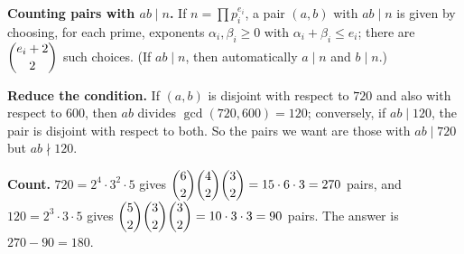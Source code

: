 \textbf{Counting pairs with $ab\mid n$.} If $n=\prod p_i^{e_i}$, a pair $(a,b)$ with $ab\mid n$ is given by choosing, for each prime, exponents $\alpha_i,\beta_i\ge0$ with $\alpha_i+\beta_i\le e_i$; there are $\dbinom{e_i+2}{2}$ such choices. (If $ab\mid n$, then automatically $a\mid n$ and $b\mid n$.)

\textbf{Reduce the condition.} If $(a,b)$ is disjoint with respect to $720$ and also with respect to $600$, then $ab$ divides $\gcd(720,600)=120$; conversely, if $ab\mid120$, the pair is disjoint with respect to both. So the pairs we want are those with $ab\mid720$ but $ab\nmid120$.

\textbf{Count.} $720=2^4\cdot3^2\cdot5$ gives $\dbinom62\dbinom42\dbinom32=15\cdot6\cdot3=270$ pairs, and $120=2^3\cdot3\cdot5$ gives $\dbinom52\dbinom32\dbinom32=10\cdot3\cdot3=90$ pairs. The answer is $270-90=\boxed{180}$.
